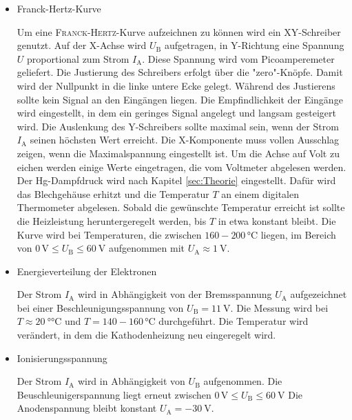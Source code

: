 \begin{itemize}

\item{Franck-Hertz-Kurve}

Um eine \textsc{Franck}-\textsc{Hertz}-Kurve aufzeichnen zu können wird ein XY-Schreiber genutzt. 
Auf der X-Achse wird $U_\mathup{B}$ aufgetragen, in Y-Richtung eine Spannung $U$ proportional zum Strom $I_\mathup{A}$. 
Diese Spannung wird vom Picoamperemeter geliefert.
Die Justierung des Schreibers erfolgt über die "zero"-Knöpfe. Damit wird der Nullpunkt in die linke untere Ecke gelegt.
Während des Justierens sollte kein Signal an den Eingängen liegen.
Die Empfindlichkeit der Eingänge wird eingestellt, in dem ein geringes Signal angelegt und langsam gesteigert wird. 
Die Auslenkung des Y-Schreibers sollte maximal sein, wenn der Strom $I_\mathup{A}$ seinen höchsten Wert erreicht.
Die X-Komponente muss vollen Ausschlag zeigen, wenn die Maximalspannung eingestellt ist.
Um die Achse auf Volt zu eichen werden einige Werte eingetragen, die vom Voltmeter abgelesen werden.
Der Hg-Dampfdruck wird nach Kapitel \ref{sec:Theorie} eingestellt.
Dafür wird das Blechgehäuse erhitzt und die Temperatur $T$ an einem digitalen Thermometer abgelesen.
Sobald die gewünschte Temperatur erreicht ist sollte die Heizleistung heruntergeregelt werden, bis $T$ in etwa konstant bleibt.
Die Kurve wird bei Temperaturen, die zwischen ${160-200}\,\si{\celsius}$ liegen, im Bereich von $0\,\si\volt \leq U_\mathup{B} \leq \SI{60}{\volt}$ aufgenommen mit $U_\mathup{A}\approx \SI{1}{\volt}$.
\item{Energieverteilung der Elektronen}

Der Strom $I_\mathup{A}$ wird in Abhängigkeit von der Bremsspannung $U_\mathup{A}$ aufgezeichnet bei einer Beschleunigungsspannung von $U_\mathup{B}=\SI{11}{\volt}$. 
Die Messung wird bei $T\approx \SI{20}{\degree\celsius}$ und $T={140-160}\,{\si\celsius}$ durchgeführt.
Die Temperatur wird verändert, in dem die Kathodenheizung neu eingeregelt wird.
\item{Ionisierungsspannung}

Der Strom $I_\mathup{A}$ wird in Abhängigkeit von $U_\mathup{B}$ aufgenommen. Die Beuschleunigerspannung liegt erneut zwischen $0\,\si\volt \leq U_\mathup{B} \leq \SI{60}{\volt}$ Die Anodenspannung bleibt konstant $U_\mathup{A}=\SI{-30}{\volt}$.
\end{itemize}
